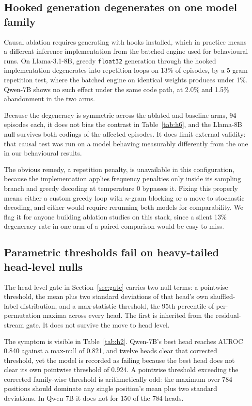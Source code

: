 \subsection{Hooked generation degenerates on one model family}
\label{sec:degeneracy}
Causal ablation requires generating with hooks installed, which in practice means a
different inference implementation from the batched engine used for behavioural runs. On
Llama-3.1-8B, greedy \texttt{float32} generation through the hooked implementation
degenerates into repetition loops on 13\% of episodes, by a 5-gram repetition test, where
the batched engine on identical weights produces under 1\%. Qwen-7B shows no such effect
under the same code path, at 2.0\% and 1.5\% abandonment in the two arms.

Because the degeneracy is symmetric across the ablated and baseline arms, 94 episodes each,
it does not bias the contrast in Table~\ref{tab:h6}, and the Llama-8B null survives both
codings of the affected episodes. It does limit external validity: that causal test was run
on a model behaving measurably differently from the one in our behavioural results.

The obvious remedy, a repetition penalty, is unavailable in this configuration, because the
implementation applies frequency penalties only inside its sampling branch and greedy
decoding at temperature 0 bypasses it. Fixing this properly means either a custom greedy
loop with $n$-gram blocking or a move to stochastic decoding, and either would require
rerunning both models for comparability. We flag it for anyone building ablation studies on
this stack, since a silent 13\% degeneracy rate in one arm of a paired comparison would be
easy to miss.
 
\subsection{Parametric thresholds fail on heavy-tailed head-level nulls}
\label{sec:pointwise}
 
The head-level gate in Section~\ref{sec:gate} carries two null terms: a pointwise threshold,
the mean plus two standard deviations of that head's own shuffled-label distribution, and a
max-statistic threshold, the 95th percentile of per-permutation maxima across every head.
The first is inherited from the residual-stream gate. It does not survive the move to head
level.
 
The symptom is visible in Table~\ref{tab:h2}. Qwen-7B's best head reaches AUROC 0.840 against
a max-null of 0.821, and twelve heads clear that corrected threshold, yet the model is
recorded as failing because the best head does not clear its own pointwise threshold of
0.924. A pointwise threshold exceeding the corrected family-wise threshold is
arithmetically odd: the maximum over 784 positions should dominate any single position's
mean plus two standard deviations. In Qwen-7B it does not for 150 of the 784 heads.
 
